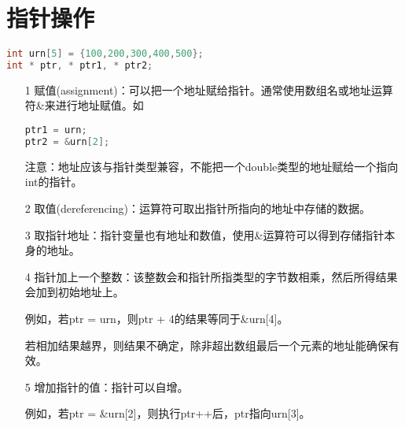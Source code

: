 \section{指针操作}

\begin{frame}[fragile]\ft{\secname}
\begin{lstlisting}[language=c,backgroundcolor=\color{red!20}]
int urn[5] = {100,200,300,400,500};
int * ptr, * ptr1, * ptr2;
\end{lstlisting}
\end{frame}

\begin{frame}[fragile]\ft{\secname}

\begin{itemize}
\item[1] 赋值({\tf assignment})：可以把一个地址赋给指针。通常使用数组名或地址运算符{\tf \&}来进行地址赋值。如
\begin{lstlisting}[language=c,backgroundcolor=\color{red!20}]
ptr1 = urn;
ptr2 = &urn[2];
\end{lstlisting}
\textcolor{acolor1}{注意：地址应该与指针类型兼容，不能把一个{\tf double}类型的地址赋给一个指向{\tf int}的指针。}
\end{itemize}
\end{frame}

\begin{frame}[fragile]\ft{\secname}
\begin{itemize}
\item[2] 取值({\tf dereferencing})：运算符{\tf *}可取出指针所指向的地址中存储的数据。\\[0.2in]
\item[3] 取指针地址：指针变量也有地址和数值，使用{\tf \&}运算符可以得到存储指针本身的地址。\\[0.2in]
\end{itemize}
\end{frame}

\begin{frame}[fragile]\ft{\secname}
\begin{itemize}
\item[4] 指针加上一个整数：该整数会和指针所指类型的字节数相乘，然后所得结果会加到初始地址上。\\[0.1in]
\item[] 例如，若{\tf ptr = urn}，则{\tf ptr + 4}的结果等同于{\tf \&urn[4]}。
\\[0.1in]
\item[]
\textcolor{acolor1}{若相加结果越界，则结果不确定，除非超出数组最后一个元素的地址能确保有效。}\\[0.2in]

\item[5] 增加指针的值：指针可以自增。\\[0.1in]
\item[] 例如，若{\tf ptr = \&urn[2]}，则执行{\tf ptr++}后，{\tf ptr}指向{\tf urn[3]}。
\end{itemize}
\end{frame}

